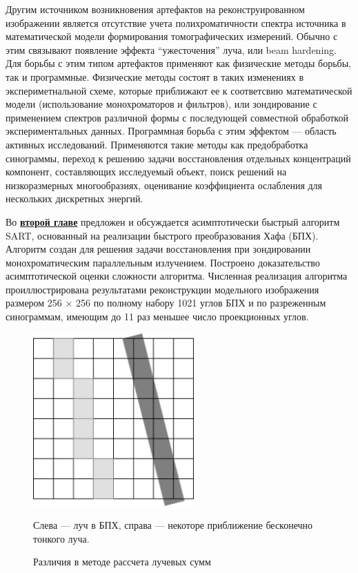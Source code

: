 Другим источником возникновения артефактов на реконструированном изображении является отсутствие учета полихроматичности спектра источника в математической модели формирования томографических измерений.
Обычно с этим связывают появление эффекта ``ужесточения'' луча, или beam hardening.
Для борьбы с этим типом артефактов применяют как физические методы борьбы, так и программные.
Физические методы состоят в таких изменениях в экспериметнальной схеме, которые приближают ее к соответсвию математической модели (использование монохроматоров и фильтров), или зондирование с применением спектров различной формы с последующей совместной обработкой экспериментальных данных.
Программная борьба с этим эффектом --- область активных исследований.
Применяются такие методы как предобработка синограммы, переход к решению задачи восстановления отдельных концентраций компонент, составляющих исследуемый объект, поиск решений на низкоразмерных многообразиях, оценивание коэффициента ослабления для нескольких дискретных энергий. %

\vspace{5mm}

Во \underline{\textbf{второй главе}} предложен и обсуждается асимптотически быстрый алгоритм SART, основанный на реализации быстрого преобразования Хафа (БПХ).
Алгоритм создан для решения задачи восстановления при зондировании монохроматическим параллельным излучением.
Построено доказательство асимптотической оценки сложности алгоритма.
Численная реализация алгоритма проиллюстрирована результатами реконструкции модельного изображения размером 256 $\times$ 256 по полному набору 1021 углов БПХ и по разреженным синограммам, имеющим до 11 раз меньшее число проекционных углов.

\begin{figure}[h!]
  \centering
    \includegraphics[width=0.55\textwidth]{Dissertation/images/part1_img/ART-Discr-ru}
 \caption{Различия в методе рассчета лучевых сумм}
Слева --- луч в БПХ, справа --- некоторе приближение бесконечно тонкого луча.
\label{fig:hough_radon}
\end{figure}


